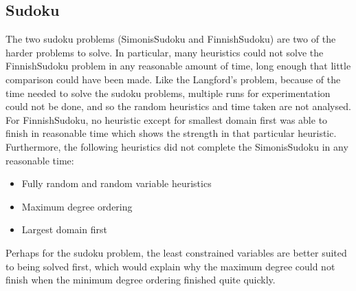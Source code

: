 \documentclass{article}
\begin{document}
\subsection{Sudoku}
The two sudoku problems (SimonisSudoku and FinnishSudoku) are two of the harder problems to solve. In particular, many heuristics could not solve the FinnishSudoku problem in any reasonable amount of time, long enough that little comparison could have been made. Like the Langford's problem, because of the time needed to solve the sudoku problems, multiple runs for experimentation could not be done, and so the random heuristics and time taken are not analysed. For FinnishSudoku, no heuristic except for smallest domain first was able to finish in reasonable time which shows the strength in that particular heuristic.
\n
Furthermore, the following heuristics did not complete the SimonisSudoku in any reasonable time:
\begin{itemize}
\item Fully random and random variable heuristics
\item Maximum degree ordering
\item Largest domain first
\end{itemize}
Perhaps for the sudoku problem, the least constrained variables are better suited to being solved first, which would explain why the maximum degree could not finish when the minimum degree ordering finished quite quickly. 
\end{document}
